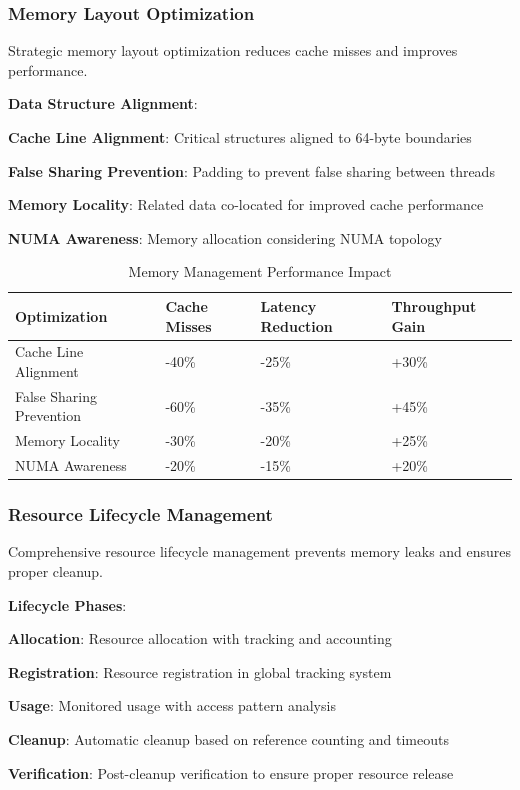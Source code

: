 \subsubsection*{Memory Layout Optimization}

Strategic memory layout optimization reduces cache misses and improves performance.

\textbf{Data Structure Alignment}:
\begin{compactlist}
    \item \textbf{Cache Line Alignment}: Critical structures aligned to 64-byte boundaries
    \item \textbf{False Sharing Prevention}: Padding to prevent false sharing between threads
    \item \textbf{Memory Locality}: Related data co-located for improved cache performance
    \item \textbf{NUMA Awareness}: Memory allocation considering NUMA topology
\end{compactlist}

\begin{table}[h]
\centering
\caption{Memory Management Performance Impact}
\label{tab:memory-performance}
\begin{tabular}{@{}llll@{}}
\toprule
\textbf{Optimization} & \textbf{Cache Misses} & \textbf{Latency Reduction} & \textbf{Throughput Gain} \\
\midrule
Cache Line Alignment & -40\% & -25\% & +30\% \\
False Sharing Prevention & -60\% & -35\% & +45\% \\
Memory Locality & -30\% & -20\% & +25\% \\
NUMA Awareness & -20\% & -15\% & +20\% \\
\bottomrule
\end{tabular}
\end{table}

\subsubsection*{Resource Lifecycle Management}

Comprehensive resource lifecycle management prevents memory leaks and ensures proper cleanup.

\textbf{Lifecycle Phases}:
\begin{expandedlist}
    \item \textbf{Allocation}: Resource allocation with tracking and accounting
    \item \textbf{Registration}: Resource registration in global tracking system
    \item \textbf{Usage}: Monitored usage with access pattern analysis
    \item \textbf{Cleanup}: Automatic cleanup based on reference counting and timeouts
    \item \textbf{Verification}: Post-cleanup verification to ensure proper resource release
\end{expandedlist}


